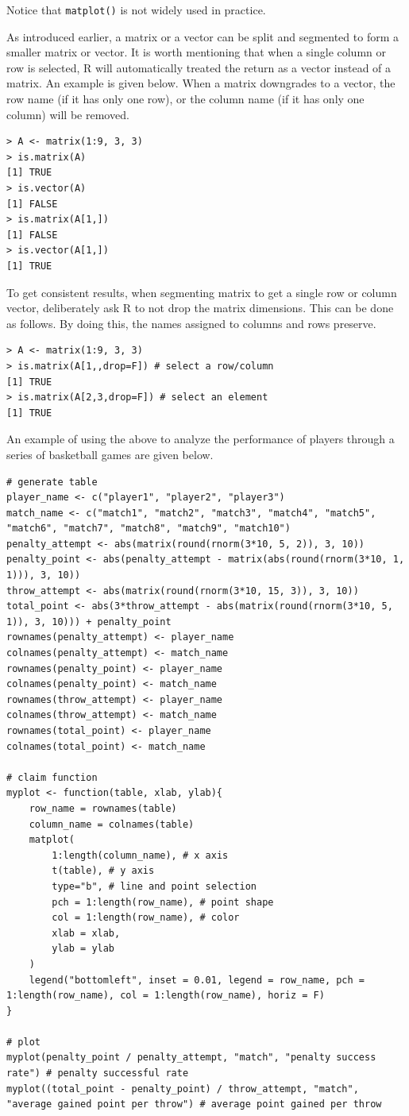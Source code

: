 Notice that \verb|matplot()| is not widely used in practice.

As introduced earlier, a matrix or a vector can be split and segmented to form a smaller matrix or vector. It is worth mentioning that when a single column or row is selected, R will automatically treated the return as a vector instead of a matrix. An example is given below. When a matrix downgrades to a vector, the row name (if it has only one row), or the column name (if it has only one column) will be removed.
\begin{lstlisting}
> A <- matrix(1:9, 3, 3)
> is.matrix(A)
[1] TRUE
> is.vector(A)
[1] FALSE
> is.matrix(A[1,])
[1] FALSE
> is.vector(A[1,])
[1] TRUE
\end{lstlisting}

To get consistent results, when segmenting matrix to get a single row or column vector, deliberately ask R to not drop the matrix dimensions. This can be done as follows. By doing this, the names assigned to columns and rows preserve.
\begin{lstlisting}
> A <- matrix(1:9, 3, 3)
> is.matrix(A[1,,drop=F]) # select a row/column
[1] TRUE
> is.matrix(A[2,3,drop=F]) # select an element
[1] TRUE
\end{lstlisting}

An example of using the above to analyze the performance of players through a series of basketball games are given below.
\begin{lstlisting}
# generate table
player_name <- c("player1", "player2", "player3")
match_name <- c("match1", "match2", "match3", "match4", "match5", "match6", "match7", "match8", "match9", "match10")
penalty_attempt <- abs(matrix(round(rnorm(3*10, 5, 2)), 3, 10))
penalty_point <- abs(penalty_attempt - matrix(abs(round(rnorm(3*10, 1, 1))), 3, 10))
throw_attempt <- abs(matrix(round(rnorm(3*10, 15, 3)), 3, 10))
total_point <- abs(3*throw_attempt - abs(matrix(round(rnorm(3*10, 5, 1)), 3, 10))) + penalty_point
rownames(penalty_attempt) <- player_name
colnames(penalty_attempt) <- match_name
rownames(penalty_point) <- player_name
colnames(penalty_point) <- match_name
rownames(throw_attempt) <- player_name
colnames(throw_attempt) <- match_name
rownames(total_point) <- player_name
colnames(total_point) <- match_name

# claim function
myplot <- function(table, xlab, ylab){
    row_name = rownames(table)
    column_name = colnames(table)
    matplot(
    	1:length(column_name), # x axis
    	t(table), # y axis
    	type="b", # line and point selection
    	pch = 1:length(row_name), # point shape
    	col = 1:length(row_name), # color
    	xlab = xlab,
    	ylab = ylab
    )
    legend("bottomleft", inset = 0.01, legend = row_name, pch = 1:length(row_name), col = 1:length(row_name), horiz = F)
}

# plot
myplot(penalty_point / penalty_attempt, "match", "penalty success rate") # penalty successful rate
myplot((total_point - penalty_point) / throw_attempt, "match", "average gained point per throw") # average point gained per throw
\end{lstlisting}

